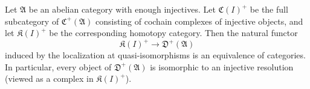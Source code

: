 Let $\mathfrak{A}$ be an abelian category with enough injectives. Let $\mathfrak{C}(I)^+$ be the full subcategory of $\mathfrak{C}^+(\mathfrak{A})$ consisting of cochain complexes of injective objects, and let $\mathfrak{K}(I)^+$ be the corresponding homotopy category. Then the natural functor
\[
\mathfrak{K}(I)^+ \longrightarrow \mathfrak{D}^+(\mathfrak{A})
\]
induced by the localization at quasi-isomorphisms is an equivalence of categories. In particular, every object of $\mathfrak{D}^+(\mathfrak{A})$ is isomorphic to an injective resolution (viewed as a complex in $\mathfrak{K}(I)^+$).
